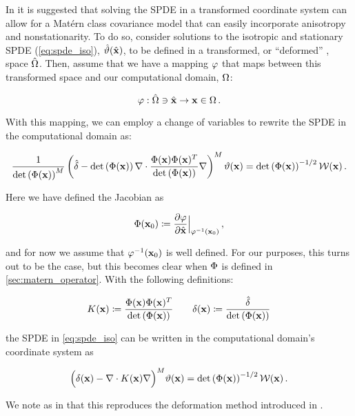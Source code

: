 In \citet{RSSB:RSSB777} it is suggested that solving the SPDE in a transformed
coordinate system can allow for a Mat\'ern class covariance
model that can easily incorporate anisotropy and nonstationarity.
To do so, consider solutions to the isotropic and stationary SPDE
(\cref{eq:spde_iso}), $\hat{\vartheta}(\hat{\mathbf{x}})$, to be defined in a transformed, or
``deformed'' \citep{sampson_nonparametric_1992}, space $\hat{\Omega}$.
Then, assume that we have a mapping $\varphi$ that maps between this transformed space
and our computational domain, $\Omega$:
\begin{linenomath*}\begin{equation*}
    \varphi : \hat{\Omega}\ni\hat{\mathbf{x}} \rightarrow \mathbf{x}\in\Omega \, .
\end{equation*}\end{linenomath*}
With this mapping, we can employ a change of variables
\citep{smith_change_1934} to rewrite the SPDE in the computational domain as:
\begin{linenomath*}\begin{equation*}
    \dfrac{1}{\text{det}\left(\Phi(\mathbf{x})\right)^M}
    \left(\hat{\delta} -
    \text{det}\left(\Phi(\mathbf{x})\right)\nabla\cdot
    \dfrac{\Phi(\mathbf{x})\Phi(\mathbf{x})^T}{\text{det}\left(\Phi(\mathbf{x})\right)}
    \nabla\right)^M\vartheta(\mathbf{x}) =
    \text{det}\left(\Phi(\mathbf{x})\right)^{-1/2}\mathcal{W}(\mathbf{x}) \, .
\end{equation*}\end{linenomath*}
Here we have defined the Jacobian as
\begin{linenomath*}\begin{equation*}
    \Phi(\mathbf{x}_0) \coloneqq
    \dfrac{\partial \varphi}{\partial \hat{\mathbf{x}}}\Big|_{\varphi^{-1}(\mathbf{x}_{0})} \, ,
\end{equation*}\end{linenomath*}
and for now we assume that $\varphi^{-1}(\mathbf{x}_0)$ is well defined.
For our purposes, this turns out to be the case, but this becomes clear when
$\Phi$ is defined in \cref{sec:matern_operator}.
With the following definitions:
\begin{linenomath*}\begin{equation}
    K(\mathbf{x}) \coloneqq
    \dfrac{\Phi(\mathbf{x})\Phi(\mathbf{x})^T}{\text{det}\left(\Phi(\mathbf{x})\right)}
    \qquad
    \delta(\mathbf{x}) \coloneqq \dfrac{\hat{\delta}}{\text{det}\left(\Phi(\mathbf{x})\right)}
    \label{eq:matern_definitions}
\end{equation}\end{linenomath*}
the SPDE in \cref{eq:spde_iso} can be written in the computational domain's coordinate system as
\begin{linenomath*}\begin{equation}
    \Big(\delta(\mathbf{x})- \nabla\cdot K(\mathbf{x})\nabla\Big)^M \vartheta(\mathbf{x}) =
    \text{det}\left(\Phi(\mathbf{x})\right)^{-1/2}\mathcal{W}(\mathbf{x}) \, .
    \label{eq:spde_general}
\end{equation}\end{linenomath*}
We note as in \citet{RSSB:RSSB777} that this reproduces the deformation method
introduced in \citet{sampson_nonparametric_1992}.

